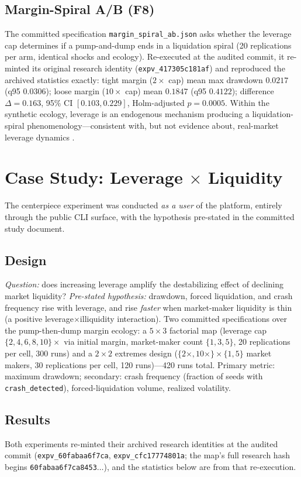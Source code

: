 \documentclass[conference]{IEEEtran}
\begin{document}
\subsection{Margin-Spiral A/B (F8)}
The committed specification \texttt{margin\_spiral\_ab.json} asks
whether the leverage cap determines if a pump-and-dump ends in a
liquidation spiral (20 replications per arm, identical shocks and
ecology). Re-executed at the audited commit, it re-minted its original
research identity (\texttt{expv\_417305c181af}) and reproduced the
archived statistics exactly: tight margin ($2\times$ cap) mean max
drawdown $0.0217$ (q95 $0.0306$); loose margin ($10\times$ cap) mean
$0.1847$ (q95 $0.4122$); difference $\Delta = 0.163$, 95\% CI
$[0.103, 0.229]$, Holm-adjusted $p = 0.0005$. Within the synthetic
ecology, leverage is an endogenous mechanism producing a
liquidation-spiral phenomenology---consistent with, but not evidence
about, real-market leverage dynamics
\cite{geanakoplos2010,brunnermeier2009,adrian2010}.

\section{Case Study: Leverage $\times$ Liquidity}
\label{sec:casestudy}
The centerpiece experiment was conducted \emph{as a user} of the
platform, entirely through the public CLI surface, with the hypothesis
pre-stated in the committed study document.

\subsection{Design}
\emph{Question:} does increasing leverage amplify the destabilizing
effect of declining market liquidity? \emph{Pre-stated hypothesis:}
drawdown, forced liquidation, and crash frequency rise with leverage,
and rise \emph{faster} when market-maker liquidity is thin (a positive
leverage$\times$illiquidity interaction). Two committed specifications
over the pump-then-dump margin ecology: a $5{\times}3$ factorial map
(leverage cap $\{2,4,6,8,10\}\times$ via initial margin, market-maker
count $\{1,3,5\}$, 20 replications per cell, 300 runs) and a
$2{\times}2$ extremes design ($\{2\times,10\times\} \times \{1,5\}$
market makers, 30 replications per cell, 120 runs)---420 runs total.
Primary metric: maximum drawdown; secondary: crash frequency (fraction
of seeds with \texttt{crash\_detected}), forced-liquidation volume,
realized volatility.

\subsection{Results}
Both experiments re-minted their archived research identities at the
audited commit (\texttt{expv\_60fabaa6f7ca},
\texttt{expv\_cfc17774801a}; the map's full research hash begins
\texttt{60fabaa6f7ca8453}$\ldots$), and the statistics below are from
that re-execution.
\end{document}
